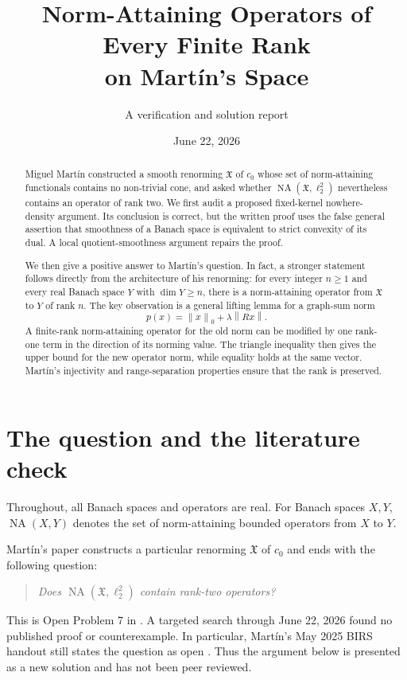 \documentclass[11pt]{article}
\title{Norm-Attaining Operators of Every Finite Rank\\on Mart\'in's Space}
\author{A verification and solution report}
\date{June 22, 2026}
\theoremstyle{definition}
\newcommand{\NA}{\operatorname{NA}}
\newcommand{\X}{\mathfrak X}
\newcommand{\norm}[1]{\left\lVert #1\right\rVert}
\begin{document}
\maketitle

\begin{abstract}
Miguel Mart\'in constructed a smooth renorming \(\X\) of \(c_0\) whose set of
norm-attaining functionals contains no non-trivial cone, and asked whether
\(\NA(\X,\ell_2^2)\) nevertheless contains an operator of rank two.  We first
audit a proposed fixed-kernel nowhere-density argument.  Its conclusion is
correct, but the written proof uses the false general assertion that smoothness
of a Banach space is equivalent to strict convexity of its dual.  A local
quotient-smoothness argument repairs the proof.

We then give a positive answer to Mart\'in's question.  In fact, a stronger
statement follows directly from the architecture of his renorming: for every
integer \(n\geq 1\) and every real Banach space \(Y\) with
\(\dim Y\geq n\), there is a norm-attaining operator from \(\X\) to \(Y\) of
rank \(n\).  The key observation is a general lifting lemma for a graph-sum
norm
\[
       p(x)=\norm{x}_0+\lambda\norm{Rx}.
\]
A finite-rank norm-attaining operator for the old norm can be modified by one
rank-one term in the direction of its norming value.  The triangle inequality
then gives the upper bound for the new operator norm, while equality holds at
the same vector.  Mart\'in's injectivity and range-separation properties ensure
that the rank is preserved.
\end{abstract}

\section{The question and the literature check}

Throughout, all Banach spaces and operators are real.  For Banach spaces
\(X,Y\), \(\NA(X,Y)\) denotes the set of norm-attaining bounded operators
from \(X\) to \(Y\).

Mart\'in's paper constructs a particular renorming \(\X\) of \(c_0\) and ends
with the following question:
\begin{quote}
\emph{Does \(\NA(\X,\ell_2^2)\) contain rank-two operators?}
\end{quote}
This is Open Problem 7 in \cite{Martin2025}.  A targeted search through
June 22, 2026 found no published proof or counterexample.  In particular,
Mart\'in's May 2025 BIRS handout still states the question as open
\cite{MartinBIRS}.  Thus the argument below is presented as a new solution and
has not been peer reviewed.
\end{document}
